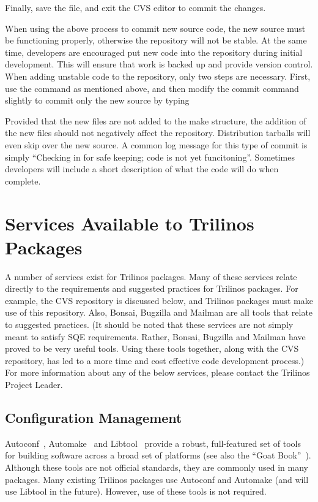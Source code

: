 \documentclass[12pt,strict]{TrilinosDevGuide}
\begin{document}
\begin{enumerate}
Finally, save the file, and exit the CVS editor to commit the changes.

When using the above process to commit new source code, the new source must 
be functioning properly, otherwise the repository will not be stable.  
At the same time, developers are encouraged put new code into the repository 
during initial development.  This will ensure that work is backed up and 
provide version control.  When adding unstable code to the repository, only
two steps are necessary.  First, use the  command as 
mentioned above, and then modify the commit command slightly to commit only 
the new source by typing


Provided that the new files are not added to the make structure, the addition 
of the new files should not negatively affect the repository.  Distribution 
tarballs will even skip over the new source.  A common log message for this 
type of commit is simply ``Checking in for safe keeping; code is not yet 
funcitoning''.  Sometimes developers will include a short description of what 
the code will do when complete.
\end{enumerate}

\section{Services Available to Trilinos Packages}
\label{Section:AvailableServices}
A number of services exist for Trilinos packages.  Many of these services 
relate directly to the requirements and suggested practices for Trilinos 
packages.  For example, the CVS repository is discussed below, and 
Trilinos packages must make use of this repository.  Also, Bonsai, Bugzilla 
and Mailman are all tools that relate to suggested practices.  (It should be 
noted that these services are not simply meant to satisfy SQE requirements.  
Rather, Bonsai, Bugzilla and Mailman have proved to be very useful tools.  
Using these tools together, along with the CVS repository, has led to a more 
time and cost effective code development process.)  For more information about 
any of the below services, please contact the Trilinos Project Leader.

\subsection{Configuration Management}
Autoconf~\cite{Autoconf},  Automake~\cite{Automake} and Libtool~\cite{Libtool} 
provide a robust, full-featured set of tools for building software across a 
broad set of platforms (see also the ``Goat Book''~\cite{GoatBook}).  Although 
these tools are not official standards, they are commonly used in many 
packages.  Many existing Trilinos packages use Autoconf and Automake (and will 
use Libtool in the future).  However, use of these tools is not required.
\end{document}
